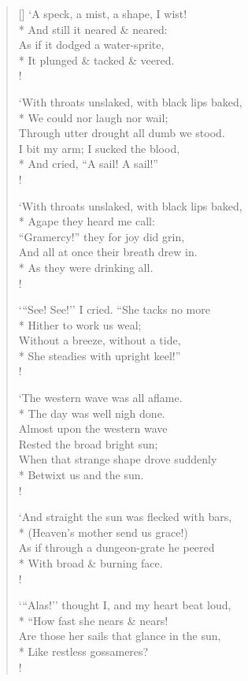 \documentclass[MAIN]{subfiles}
\begin{document}
\begin{verse}[\versewidth]
`A speck, a mist, a shape, I wist!\\*
\vin And still it neared \& neared:\\
As if it dodged a water-sprite,\\*
\vin It plunged \& tacked \& veered.\\!

`With throats unslaked, with black lips baked,\\*
\vin We could nor laugh nor wail;\\
Through utter drought all dumb we stood.\\
I bit my arm; I sucked the blood,\\*
\vin And cried, ``A sail! A sail!''\\!

`With throats unslaked, with black lips baked,\\*
\vin Agape they heard me call:\\
``Gramercy!'' they for joy did grin,\\
And all at once their breath drew in.\\*
\vin As they were drinking all.\\!

`{``}See! See!'' I cried. ``She tacks no more\\*
\vin Hither to work us weal;\\
Without a breeze, without a tide,\\*
\vin She steadies with upright keel!''\\!

`The western wave was all aflame.\\*
\vin The day was well nigh done.\\
Almost upon the western wave\\
\vin Rested the broad bright sun;\\
When that strange shape drove suddenly\\*
\vin Betwixt us and the sun.\\!

`And straight the sun was flecked with bars,\\*
\vin (Heaven's mother send us grace!)\\
As if through a dungeon-grate he peered\\*
\vin With broad \& burning face.\\!

`{``}Alas!'' thought I, and my heart beat loud,\\*
\vin ``How fast she nears \& nears!\\
Are those her sails that glance in the sun,\\*
\vin Like restless gossameres?\\!


\end{verse}
\end{document}
